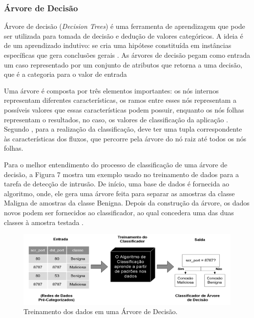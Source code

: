 \subsubsection{Árvore de Decisão}

\par
Árvore de decisão (\textit{Decision Trees}) é uma ferramenta de aprendizagem que pode ser utilizada para tomada de decisão e dedução de valores categóricos. A ideia é de um aprendizado indutivo: se cria uma hipótese constituída em instâncias específicas que gera conclusões gerais \cite{Marques2014}. As árvores de decisão pegam como entrada um caso representado por um conjunto de atributos que retorna a uma decisão, que é a categoria para o valor de entrada


\par
Uma árvore é composta por três elementos importantes: os nós internos representam diferentes características, os ramos entre esses nós representam a possíveis valores que essas características podem possuir, enquanto os nós folhas representam o resultados, no caso, os valores de classificação da aplicação \cite{Henke2011, Barros2012}. Segundo , para a realização da classificação, deve ter uma tupla correspondente às características dos fluxos, que percorre pela árvore do nó raiz até  todos os nós folhas.  

\par
Para o melhor entendimento do processo de classificação de uma árvore de decisão, a Figura 7 mostra um exemplo usado no treinamento de dados para a tarefa de detecção de intrusão. De início, uma base de dados é fornecida ao algoritmo, onde, ele gera uma árvore feita para separar as amostras da classe Maligna de amostras da classe Benigna. Depois da construção da árvore, os dados novos podem ser fornecidos ao classificador, ao qual concedera uma das duas classes à amostra testada \cite{Henke2011}. 

\begin{figure}[!htp]
	\begin{center}
    \caption{\label{fig:waveform_fig} Treinamento dos dados em uma Árvore de Decisão.}
	\includegraphics[scale=0.50]{Figuras/Arvore_decisao.png}
	\end{center}
\end{figure}

